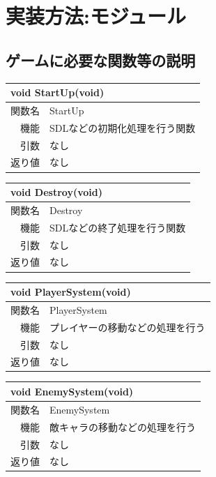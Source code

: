 \documentclass{jarticle}
\begin{document}
\section{実装方法:モジュール}
\subsection{ゲームに必要な関数等の説明}

\begin{table}[H]
\begin{tabular}{|r|l|}
\hline
\multicolumn{2}{|l|}{void StartUp(void)}       \\ \hline
関数名           & StartUp \\ \hline
機能     & SDLなどの初期化処理を行う関数  \\
引数 	 	 & なし \\
返り値	 & なし \\ \hline
\end{tabular}
\end{table}


\begin{table}[H]
\begin{tabular}{|r|l|}
\hline
\multicolumn{2}{|l|}{void Destroy(void)}       \\ \hline
関数名           & Destroy \\ \hline
機能     & SDLなどの終了処理を行う関数  \\
引数 	 	 & なし \\
返り値	 & なし \\ \hline
\end{tabular}
\end{table}


\begin{table}[H]
\begin{tabular}{|r|l|}
\hline
\multicolumn{2}{|l|}{void PlayerSystem(void)}       \\ \hline
関数名           & PlayerSystem\\ \hline
機能     &  プレイヤーの移動などの処理を行う  \\
引数 	 	 & なし \\
返り値	 & なし \\ \hline
\end{tabular}
\end{table}


\begin{table}[H]
\begin{tabular}{|r|l|}
\hline
\multicolumn{2}{|l|}{void EnemySystem(void)}       \\ \hline
関数名           &  EnemySystem \\ \hline
機能     & 敵キャラの移動などの処理を行う  \\
引数 	 	 & なし \\
返り値	 & なし \\ \hline
\end{tabular}
\end{table}
\end{document}
